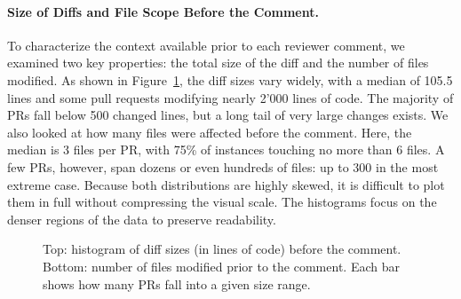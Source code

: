 \paragraph{Size of Diffs and File Scope Before the Comment.}
To characterize the context available prior to each reviewer comment, we examined two key
properties: the total size of the diff and the number of files modified. As shown in
Figure~\ref{fig:diff-before}, the diff sizes vary widely, with a median of 105.5 lines and some pull
requests modifying nearly 2'000 lines of code. The majority of PRs fall below 500 changed lines,
but a long tail of very large changes exists. We also looked at how many files were affected before
the comment. Here, the median is 3 files per PR, with 75\% of instances touching no more than 6
files. A few PRs, however, span dozens or even hundreds of files: up to 300 in the most extreme
case. Because both distributions are highly skewed, it is difficult to plot them in full without
compressing the visual scale. The histograms focus on the denser regions of the data to preserve
readability.

\begin{figure}[!htbp]
	\centering

	\vspace{1em}


	\caption{Top: histogram of diff sizes (in lines of code) before the comment. Bottom: number of files modified prior to the comment. Each bar shows how many PRs fall into a given size range.}
	\label{fig:diff-before}
\end{figure}
\FloatBarrier

